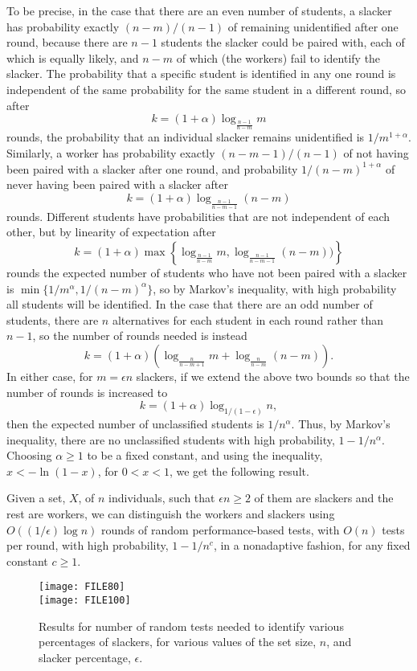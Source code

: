 \documentclass[11pt]{llncs}
\begin{document}
To be precise, in the case that there are an even number of students,
 a slacker has probability exactly $(n-m)/(n-1)$ of remaining
unidentified after one round, because there are $n-1$ students the slacker could be paired with, each of which is equally likely, and $n-m$ of which (the workers) fail to identify the slacker.
The probability that a specific student is identified in any one round is independent of the same probability for the same student in a different round, 
so after
\[
k = 
(1+\alpha)\log_{\frac{n-1}{n-m}} m
\]
rounds, the probability that an individual slacker remains unidentified is 
$1/m^{1+\alpha}$. 
Similarly, a worker has probability exactly $(n-m-1)/(n-1)$ of not having been paired with a slacker after one round, and probability 
$1/(n-m)^{1+\alpha}$ of never having been paired with a slacker after
\[
k = 
(1+\alpha)\log_{\frac{n-1}{n-m-1}} (n-m)
\]
rounds.
Different students have probabilities that are not independent of each other, 
but by linearity of expectation
after
\[
k = 
(1+\alpha)\max\left\{\log_{\frac{n-1}{n-m}} m,\log_{\frac{n-1}{n-m-1}} (n-m))\right\}
\]
rounds the expected number of students who have not been paired with 
a slacker is $\min\{1/m^{\alpha},1/(n-m)^{\alpha}\}$, 
so by Markov's inequality, 
with high probability all students will be identified. 
In the case that there are an odd number of students, 
there are $n$ alternatives for each student in each round rather than $n-1$, 
so the number of rounds needed is instead
\[
k = 
(1+\alpha)(\log_{\frac{n}{n-m+1}} m+\log_{\frac{n}{n-m}} (n-m)).
\]
In either case, for $m=\epsilon n$ slackers, if we 
extend the above two bounds so that the number of rounds is increased to
\[
k = (1+\alpha)\log_{1/(1-\epsilon)} n,
\]
then the expected number of 
unclassified students is $1/n^{\alpha}$.
Thus, by Markov's inequality, there are no unclassified students
with high probability, $1-1/n^{\alpha}$.
Choosing $\alpha\ge 1$ to be a fixed constant, and using the inequality,
$x<-\ln (1-x)$, for $0<x<1$, we get the following result.

\begin{theorem}
Given a set, $X$, of $n$ individuals, such that $\epsilon n\ge 2$ of 
them are slackers and the rest are workers, we can distinguish the workers
and slackers using $O((1/\epsilon)\log n)$ rounds of 
random performance-based tests, with $O(n)$ tests per round, with high
probability, $1-1/n^c$, in a nonadaptive fashion, for any fixed constant
$c\ge 1$.
\end{theorem}

\begin{figure}[p]
\begin{center}
\texttt{[image: FILE80]} \\
\texttt{[image: FILE100]} 
\caption{\label{fig-results} Results for number of random tests needed
to identify various percentages of slackers, for various values of the set
size, $n$, and slacker percentage, $\epsilon$.}
\end{center}
\end{figure}
\end{document}
